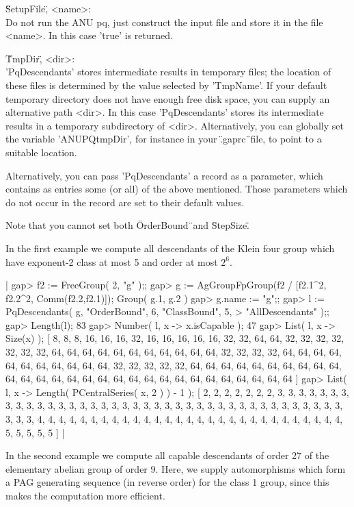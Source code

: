 \"SetupFile\", <name>: \\
    Do not run the ANU pq, just construct  the input file and store it in
    the file <name>. In this case 'true' is returned.

\"TmpDir\", <dir>: \\
    'PqDescendants' stores intermediate results  in temporary  files; the
    location  of  these  files  is  determined  by the value  selected by
    'TmpName'.  If your default temporary directory does not  have enough
    free disk space,  you can supply an alternative path  <dir>.  In this
    case 'PqDescendants' stores its intermediate results  in  a temporary
    subdirectory of <dir>.
    Alternatively, you can globally set  the  variable 'ANUPQtmpDir', for
    instance in your \".gaprc\"\ file, to point to a suitable location.

Alternatively,  you can pass 'PqDescendants'  a record  as  a  parameter,
which  contains  as  entries some (or all) of the above mentioned.  Those
parameters  which do not occur  in  the record are  set  to their default
values.

Note that you cannot set both \"OrderBound\"\ and \"StepSize\".

In the first example  we  compute all descendants of the Klein four group
which have exponent-2 class at most 5 and order at most $2^6$.

|    gap> f2 := FreeGroup( 2, "g" );;
    gap> g := AgGroupFpGroup(f2 / [f2.1^2, f2.2^2, Comm(f2.2,f2.1)]);
    Group( g.1, g.2 )
    gap> g.name := "g";;
    gap> l := PqDescendants( g, "OrderBound", 6, "ClassBound", 5,
    >                        "AllDescendants" );;
    gap> Length(l);
    83
    gap> Number( l, x -> x.isCapable );
    47
    gap> List( l, x -> Size(x) );
    [ 8, 8, 8, 16, 16, 16, 32, 16, 16, 16, 16, 16, 32, 32, 64, 64, 32,
      32, 32, 32, 32, 32, 32, 64, 64, 64, 64, 64, 64, 64, 64, 64, 64, 64,
      32, 32, 32, 32, 64, 64, 64, 64, 64, 64, 64, 64, 64, 64, 64, 32, 32,
      32, 32, 32, 64, 64, 64, 64, 64, 64, 64, 64, 64, 64, 64, 64, 64, 64,
      64, 64, 64, 64, 64, 64, 64, 64, 64, 64, 64, 64, 64, 64, 64 ]
    gap> List( l, x -> Length( PCentralSeries( x, 2 ) ) - 1 );
    [ 2, 2, 2, 2, 2, 2, 2, 3, 3, 3, 3, 3, 3, 3, 3, 3, 3, 3, 3, 3, 3, 3,
      3, 3, 3, 3, 3, 3, 3, 3, 3, 3, 3, 3, 3, 3, 3, 3, 3, 3, 3, 3, 3, 3,
      3, 3, 3, 3, 3, 4, 4, 4, 4, 4, 4, 4, 4, 4, 4, 4, 4, 4, 4, 4, 4, 4,
      4, 4, 4, 4, 4, 4, 4, 4, 4, 4, 4, 4, 5, 5, 5, 5, 5 ] |

In the second example we compute all  capable descendants of order  27 of
the  elementary abelian group of order 9.  Here, we supply  automorphisms
which form a  PAG generating  sequence (in reverse order) for the class 1
group, since this  makes the computation more efficient.

